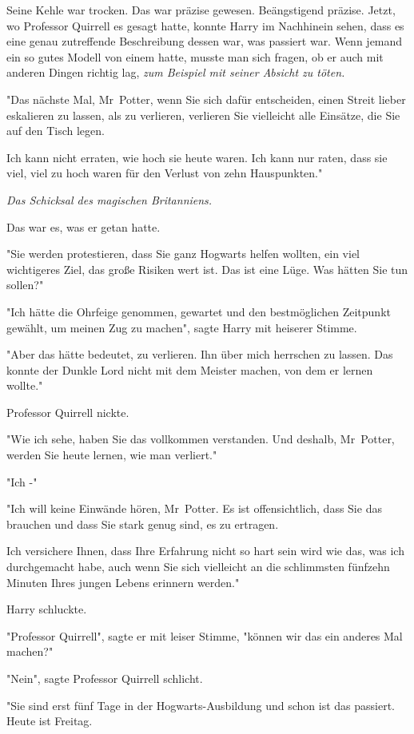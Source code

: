 {Seine Kehle war trocken. Das war präzise gewesen. Beängstigend präzise. Jetzt, wo Professor Quirrell es gesagt hatte, konnte Harry im Nachhinein sehen, dass es eine genau zutreffende Beschreibung dessen war, was passiert war. Wenn jemand ein so gutes Modell von einem hatte, musste man sich fragen, ob er auch mit anderen Dingen richtig lag, \emph{zum Beispiel mit seiner Absicht zu töten.}

"Das nächste Mal, Mr~Potter, wenn Sie sich dafür entscheiden, einen Streit lieber eskalieren zu lassen, als zu verlieren, verlieren Sie vielleicht alle Einsätze, die Sie auf den Tisch legen.

Ich kann nicht erraten, wie hoch sie heute waren. Ich kann nur raten, dass sie viel, viel zu hoch waren für den Verlust von zehn Hauspunkten."

\emph{Das Schicksal des magischen Britanniens.}

Das war es, was er getan hatte.

"Sie werden protestieren, dass Sie ganz Hogwarts helfen wollten, ein viel wichtigeres Ziel, das große Risiken wert ist. Das ist eine Lüge. Was hätten Sie tun sollen?"

"Ich hätte die Ohrfeige genommen, gewartet und den bestmöglichen Zeitpunkt gewählt, um meinen Zug zu machen", sagte Harry mit heiserer Stimme.

"Aber das hätte bedeutet, zu verlieren. Ihn über mich herrschen zu lassen. Das konnte der Dunkle Lord nicht mit dem Meister machen, von dem er lernen wollte."

Professor Quirrell nickte.

"Wie ich sehe, haben Sie das vollkommen verstanden. Und deshalb, Mr~Potter, werden Sie heute lernen, wie man verliert."

"Ich -"

"Ich will keine Einwände hören, Mr~Potter. Es ist offensichtlich, dass Sie das brauchen und dass Sie stark genug sind, es zu ertragen.

Ich versichere Ihnen, dass Ihre Erfahrung nicht so hart sein wird wie das, was ich durchgemacht habe, auch wenn Sie sich vielleicht an die schlimmsten fünfzehn Minuten Ihres jungen Lebens erinnern werden."

Harry schluckte.

"Professor Quirrell", sagte er mit leiser Stimme, "können wir das ein anderes Mal machen?"

"Nein", sagte Professor Quirrell schlicht.

"Sie sind erst fünf Tage in der Hogwarts-Ausbildung und schon ist das passiert. Heute ist Freitag.

}
